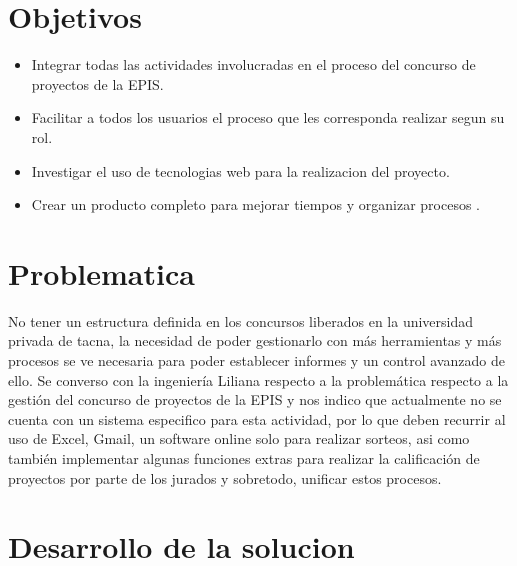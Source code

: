 \documentclass[%
 reprint,
 amsmath,amssymb,
 aps,
]{revtex4-1}
\begin{document}
\section {Objetivos}
\begin{itemize}
\item Integrar todas las actividades involucradas en el proceso del concurso de proyectos de la EPIS. \\
\item Facilitar a todos los usuarios el proceso que les corresponda realizar segun su rol. \\
\item Investigar el uso de tecnologias web para la realizacion del proyecto.  \\
\item Crear un producto completo para mejorar tiempos y organizar procesos .\\
\end{itemize}

\section {Problematica}
No tener un estructura definida en los concursos liberados en la universidad privada de tacna, la necesidad de poder gestionarlo con más herramientas y más procesos se ve necesaria para poder establecer informes y un control avanzado de ello. 
Se converso con la ingeniería Liliana respecto a la problemática respecto a la gestión del concurso de proyectos de la EPIS y nos indico que actualmente no se cuenta con un sistema especifico para esta actividad, por lo que deben recurrir al uso de Excel, Gmail, un software online solo para realizar sorteos, asi como también implementar algunas funciones extras para realizar la calificación de proyectos por parte de los jurados y sobretodo, unificar estos procesos.

\section {Desarrollo de la solucion}
\end{document}

